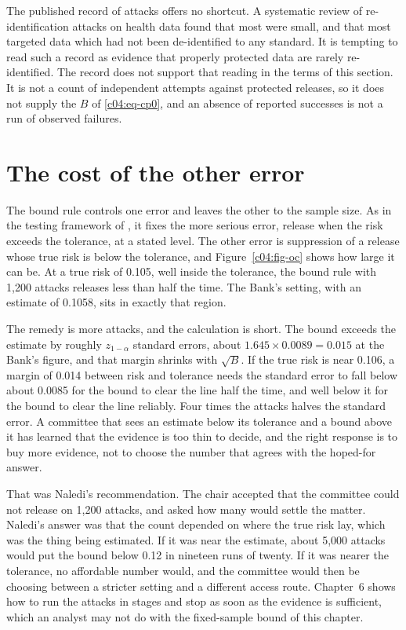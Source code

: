 The published record of attacks offers no shortcut. A systematic review of
re-identification attacks on health data \citep{elemam2011} found that most were small,
and that most targeted data which had not been de-identified to any standard. It is
tempting to read such a record as evidence that properly protected data are rarely
re-identified. The record does not support that reading in the terms of this section. It
is not a count of independent attempts against protected releases, so it does not supply
the $B$ of \eqref{c04:eq-cp0}, and an absence of reported successes is not a run of
observed failures.

\section{The cost of the other error}\label{c04:sec-suppression}

The bound rule controls one error and leaves the other to the sample size. As in the
testing framework of \citet{neyman1933}, it fixes the more serious error, release
when the risk exceeds the tolerance, at a stated level. The other error is suppression
of a release whose true risk is below the tolerance, and Figure~\ref{c04:fig-oc} shows
how large it can be. At a true risk of 0.105, well inside the tolerance, the bound rule
with 1,200 attacks releases less than half the time.
The Bank's setting, with an estimate of 0.1058, sits in exactly that region.

The remedy is more attacks, and the calculation is short. The bound exceeds
the estimate by roughly $z_{1-\alpha}$ standard errors, about $1.645 \times 0.0089 =
0.015$ at the Bank's figure, and that margin shrinks with $\sqrt{B}$. If the true risk is
near 0.106, a margin of 0.014 between risk and tolerance needs the standard error to fall
below about 0.0085 for the bound to clear the line half the time, and well below it for
the bound to clear the line reliably.
Four times the attacks halves the standard error. A committee that sees an estimate below
its tolerance and a bound above it has learned that the evidence is too thin to decide,
and the right response is to buy more evidence, not to choose the number that agrees with
the hoped-for answer.

That was Naledi's recommendation. The chair accepted that the committee could not
release on 1,200 attacks, and asked how many would settle the matter. Naledi's answer was that the count depended on where the true risk lay, which was the
thing being estimated. If it was near the estimate, about 5,000 attacks would put the
bound below 0.12 in nineteen runs of twenty.
If it was nearer the tolerance, no affordable number would,
and the committee would then be choosing between a stricter setting and a different
access route. Chapter~6 shows how to run the attacks in stages and stop as soon as the
evidence is sufficient, which an analyst may not do with the fixed-sample bound of this
chapter.

